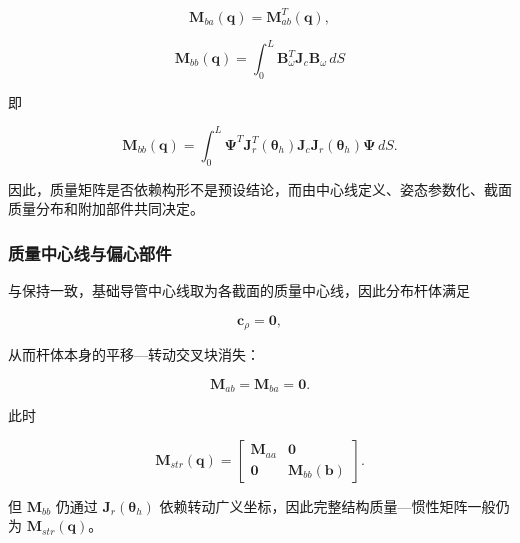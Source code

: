 \begin{equation}
\label{eq:galerkin-2-42}
\mathbf{M}_{ba}\left( \mathbf{q} \right) = \mathbf{M}_{ab}^{T}\left( \mathbf{q} \right),
\end{equation}

\begin{equation}
\label{eq:galerkin-2-43}
\boxed{\mathbf{M}_{bb}\left( \mathbf{q} \right) = \int_{0}^{L}\mathbf{B}_{\omega}^{T}\mathbf{J}_{c}\mathbf{B}_{\omega}\, dS}
\end{equation}

即

\begin{equation}
\label{eq:galerkin-2-44}
\mathbf{M}_{bb}\left( \mathbf{q} \right) = \int_{0}^{L}\bm{\Psi}^{T}\mathbf{J}_{r}^{T}\left( \bm{\theta}_{h} \right)\mathbf{J}_{c}\mathbf{J}_{r}\left( \bm{\theta}_{h} \right)\bm{\Psi}\, dS.
\end{equation}

因此，质量矩阵是否依赖构形不是预设结论，而由中心线定义、姿态参数化、截面质量分布和附加部件共同决定。

\subsubsection{质量中心线与偏心部件}\label{sec:galerkin-2-4-4}

与保持一致，基础导管中心线取为各截面的质量中心线，因此分布杆体满足

\begin{equation}
\label{eq:galerkin-2-45}
\mathbf{c}_{\rho} = \mathbf{0},
\end{equation}

从而杆体本身的平移---转动交叉块消失：

\begin{equation}
\label{eq:galerkin-2-46}
\mathbf{M}_{ab} = \mathbf{M}_{ba} = \mathbf{0}.
\end{equation}

此时

\begin{equation}
\label{eq:galerkin-2-47}
\mathbf{M}_{str}\left( \mathbf{q} \right) = \begin{bmatrix}
\mathbf{M}_{aa} & \mathbf{0} \\
\mathbf{0} & \mathbf{M}_{bb}\left( \mathbf{b} \right)
\end{bmatrix}.
\end{equation}

但 \(\mathbf{M}_{bb}\) 仍通过 \(\mathbf{J}_{r}\left( \bm{\theta}_{h} \right)\) 依赖转动广义坐标，因此完整结构质量---惯性矩阵一般仍为 \(\mathbf{M}_{str}\left( \mathbf{q} \right)\)。

